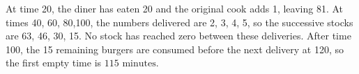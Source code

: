 At time 20, the diner has eaten 20 and the original cook adds 1, leaving 81. At times 40, 60, 80,100, the numbers delivered are 2, 3, 4, 5, so the successive stocks are 63, 46, 30, 15. No stock has reached zero between these deliveries. After time 100, the 15 remaining burgers are consumed before the next delivery at 120, so the first empty time is $\boxed{115\text{ minutes}}$.
